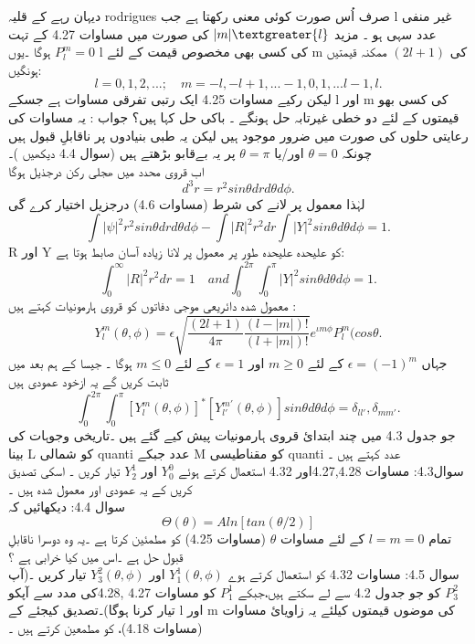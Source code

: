 \documentclass{book}
\begin{document}
دیہان رہے کے قلیہ rodrigues صرف اُس صورت کوئی معنی رکھتا ہے جب l غیر منفی عدد سہی ہو ۔
مزید
\(|m|\textgreater{l}\)
کی صورت میں مساوات 
4.27
کے تہت
\(P_{l}^{m}=0\)
ہوگا ۔یوں l کی کسی بھی مخصوص قیمت کے لئے m کی
\((2l+1)\)
ممکنہ قیمتیں ہونگیں:\\
\[l=0,1,2,...;\quad{m=-l,-l+1,...-1,0,1,...l-1,l.}\]
لیکن رکیے مساوات 
4.25
ایک رتبی تفرقی مساوات ہے جسکے l اور m کی کسی بھو قیمتوں کے لئے دو خطی غیرتابہ حل ہونگے ۔ باکی حل کہا ہیں؟
جواب :
یہ مساوات کی رعایتی حلوں کی  صورت میں ضرور موجود ہیں لیکن یہ طبی بنیادوں پر ناقابلِ قبول ہیں چونکہ
\(\theta=0\)
اور/یا
\(\theta=\pi\)
پر یہ بےقابو بڑھتے ہیں (سوال 4.4 دیکھیں )۔\\
اب قروی محدد میں ھجلی رکن درجذیل ہوگا
\[d^{3}r=r^{2}sin\theta{dr}d\theta{d\phi}.\]
لہٰذا معمول پر لانے کی شرط (مساوات 
4.6)
درجزیل اختیار کرے گی
\[\int|\psi|^{2}r^{2}sin\theta{drd\theta}d\phi-\int|R|^{2}r^{2}dr\int|Y|^{2}sin\theta{d\theta}d\phi=1.\]
R اور Y کو علیحدہ علیحدہ طور پر معمول پر لانا زیادہ آسان صابط ہوتا ہے:\\
\[\int_{0}^{\infty}|R|^{2}r^{2}dr=1\quad{and}\int_{0}^{2\pi}\int_{0}^{\pi}|Y|^{2}sin\theta{d\theta}d\phi=1.\]
معمول شدہ  دائریعی موجی دفاتوں کو قروی ہارمونیات کہتے ہیں :\\
\[\boxed{Y_{l}^{m}(\theta,\phi)=\epsilon\sqrt{\frac{(2l+1)}{4\pi}\frac{(l-|m|)!}{(l+|m|)!}}e^{\iota{m\phi}}P_{l}^{m}(cos\theta.}\]
جہاں
\(\epsilon=(-1)^{m}\)
کے لئے
\(m\geq0\)
اور
\(\epsilon=1\)
کے لئے
\(m\leq0\)
ہوگا ۔ جیسا کے ہم بعد میں ثابت کریں گے یہ ازخود عمودی ہیں \\
\[\int_{0}^{2\pi}\int_{0}^{\pi}[Y_{l}^{m}(\theta,\phi)]^{*}[Y_{l'}^{m'}(\theta,\phi)]sin\theta{d\theta}d\phi=\delta_{ll'},\delta_{mm'}.\]
جو جدول
4.3
میں چند ابتدائ قروی ہارمونیات پیش کیے گئے ہیں ۔تاریخی وجوہات کی بینا L کو شمالی quanti عدد جبکے M کو مقناطیسی quanti عدد کہتے ہیں ۔\\
سوال4.3:
مساوات 4.27,4.28اور 4.32 استعمال کرتے ہوئے 
\(Y_{0}^{0}\)
اور
\(Y_{2}^{1}\)
تیار کریں ۔ اسکی تصدیق کریں کے یہ عمودی اور معمول شدہ ہیں ۔\\
سوال 4.4:
دیکھائیں کہ
\[\Theta(\theta)=Aln[tan(\theta/2)]\]
تمام
\(l=m=0\)
کے لئے مساوات
\(\theta\)
(مساوات 4.25) کو مطمئین کرتا ہے ۔یہ وہ دوسرا ناقابلِ قبول حل ہے ۔اس میں کیا خرابی ہے ؟\\
سوال 4.5:
مساوات 4.32 کو استعمال کرتے ہوے
\(Y_{1}^{1}(\theta,\phi)\)
اور
\(Y_{3}^{2}(\theta,\phi)\)
تیار کریں ۔(آپ
\(P_{3}^{2}\)
کو جو جدول 4.2 سے لے سکتے ہیں،جبکے
\(P_{1}^{1}\)
کو مساوات 4.27 ,4.28کی مدد سے آپکو تیار کرنا ہوگا)۔تصدیق کیجئے کے l اور m کی موضوں قیمتوں کیلئے یہ زاویائ مساوات (مساوات 4.18)، کو  مطمعین کرتے ہیں ۔\\
\end{document}
